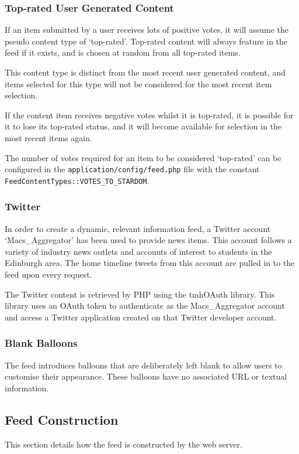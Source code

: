 \subsubsection{Top-rated User Generated Content}
If an item submitted by a user receives lots of positive votes, it will assume the pseudo content type of `top-rated'. Top-rated content will always feature in the feed if it exists, and is chosen at random from all top-rated items.

This content type is distinct from the most recent user generated content, and items selected for this type will not be considered for the most recent item selection.

If the content item receives negative votes whilst it is top-rated, it is possible for it to lose its top-rated status, and it will become available for selection in the most recent items again.

The number of votes required for an item to be considered `top-rated' can be configured in the \texttt{application/config/feed.php} file with the constant \texttt{FeedContentTypes::VOTES\_TO\_STARDOM}.

\subsubsection{Twitter}
In order to create a dynamic, relevant information feed, a Twitter account `Macs\_Aggregator' has been used to provide news items. This account follows a variety of industry news outlets and accounts of interest to students in the Edinburgh area. The home timeline tweets from this account are pulled in to the feed upon every request.

The Twitter content is retrieved by PHP using the tmhOAuth library. This library uses an OAuth token to authenticate as the Macs\_Aggregator account and access a Twitter application created on that Twitter developer account.

\subsubsection{Blank Balloons}
The feed introduces balloons that are deliberately left blank to allow users to customise their appearance. These balloons have no associated URL or textual information.

\subsection{Feed Construction}
This section details how the feed is constructed by the web server.

